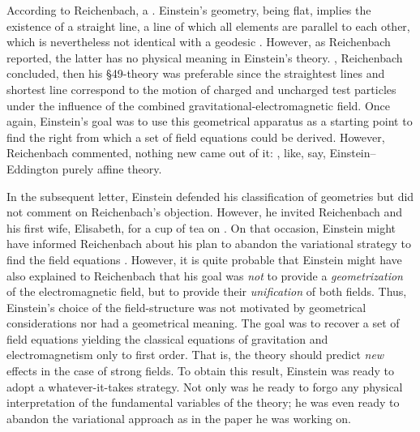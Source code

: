 \documentclass[draft]{article}
\newcommand{\manu}[1]{\citep[#1]{Reichenbach1928b}}
\begin{document}
According to Reichenbach, a  \manu{7}. Einstein's geometry, being flat, implies the existence of a straight line, a line of which all elements are parallel to each other, which is nevertheless not identical with a geodesic \citep[224]{Einstein19282}. However, as Reichenbach reported, the latter has no physical meaning in Einstein's theory. , Reichenbach concluded, then his \S49-theory was preferable since the straightest lines and shortest line correspond to the motion of charged and uncharged test particles under the influence of the combined gravitational-electromagnetic field. Once again, Einstein's goal was to use this geometrical apparatus as a starting point to find the right  from which a set of field equations could be derived. However, Reichenbach commented, nothing new came out of it:  \manu{6}, like, say, Einstein--Eddington purely affine theory. 

In the subsequent letter, Einstein defended his classification of geometries but did not comment on Reichenbach's objection. However, he invited Reichenbach and his first wife, Elisabeth, for a cup of tea on . On that occasion, Einstein might have informed Reichenbach about his plan to abandon the variational strategy to find the field equations \citep{Sauer2006}. However, it is quite probable that Einstein might have also explained to Reichenbach that his goal was \emph{not} to provide a \emph{geometrization} of the electromagnetic field, but to provide their \emph{unification} of both fields. Thus, Einstein's choice of the field-structure was not motivated by geometrical considerations nor had a geometrical meaning. The goal was to recover a set of field equations yielding the classical equations of gravitation and electromagnetism only to first order. That is, the theory should predict \emph{new} effects in the case of strong fields. To obtain this result, Einstein was ready to adopt a whatever-it-takes strategy. Not only was he ready to forgo any physical interpretation of the fundamental variables of the theory; he was even ready to abandon the variational approach as in the paper he was working on. 
\end{document}
